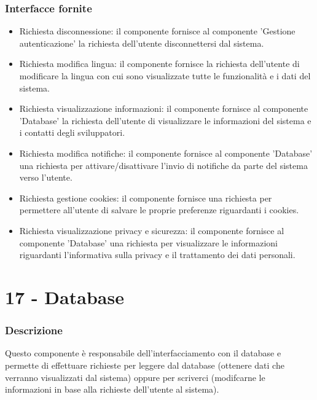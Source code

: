 \documentclass[a4paper,12pt]{article}
\begin{document}
\subsubsection*{Interfacce fornite}
\begin{itemize} \setlength\itemsep{0.01em}
\item {\sffamily Richiesta disconnessione}: il componente fornisce al componente 'Gestione autenticazione' la richiesta dell'utente disconnettersi dal sistema.
\item {\sffamily Richiesta modifica lingua}: il componente fornisce la richiesta dell'utente di modificare la lingua con cui sono visualizzate tutte le funzionalità e i dati del sistema.
\item {\sffamily Richiesta visualizzazione informazioni}: il componente fornisce al componente 'Database'  la richiesta dell'utente di visualizzare le informazioni del sistema e i contatti degli sviluppatori.
\item {\sffamily Richiesta modifica notifiche}: il componente fornisce al componente 'Database' una richiesta per attivare/disattivare l'invio di notifiche da parte del sistema verso l'utente.
\item {\sffamily Richiesta gestione cookies}: il componente fornisce una richiesta per permettere all'utente di salvare le proprie preferenze riguardanti i cookies.
\item {\sffamily Richiesta visualizzazione privacy e sicurezza}: il componente fornisce al componente 'Database' una richiesta per visualizzare le informazioni riguardanti l'informativa sulla privacy e il trattamento dei dati personali.

\end{itemize}



\section*{17 - Database}
\subsubsection*{Descrizione}
Questo componente è responsabile dell'interfacciamento con il database e permette di effettuare richieste per leggere dal  database (ottenere dati che verranno visualizzati dal sistema) oppure per scriverci (modifcarne le informazioni in base alla richieste dell'utente al sistema).
\end{document}
